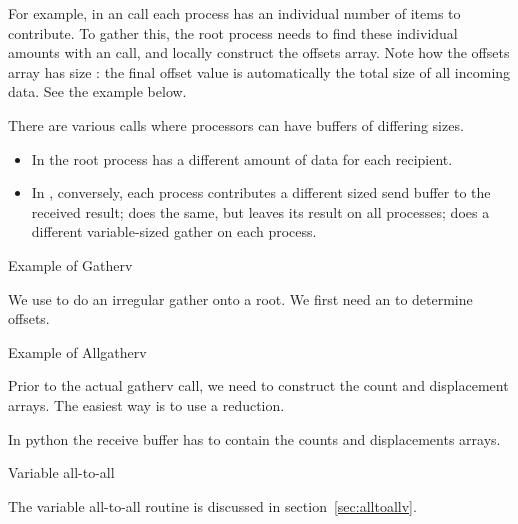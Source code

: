 For example, in an  call each process has an individual
number of items to contribute. To gather this, the root process needs
to find these individual amounts with an  call, and
locally construct the offsets array. Note how the offsets array has
size : the final offset value is automatically the total
size of all incoming data. See the example below.

There are various calls where processors can have
buffers of differing sizes.
\begin{itemize}
\item In  the root process has a different
  amount of data for each recipient.
\item In , conversely, each process
  contributes a different sized send buffer to the received result;
   does the same, but leaves its result
  on all processes;  does a different
  variable-sized gather on each process.
\end{itemize}

 {Example of Gatherv}

We use  to do an irregular gather onto a root. We first need an
 to determine offsets.
%
%


 {Example of Allgatherv}

Prior to the actual gatherv call, we need to construct the count and
displacement arrays. The easiest way is to use a reduction.


In python the receive buffer has to contain the counts and
displacements arrays.



 {Variable all-to-all}

The variable all-to-all routine 
is discussed in section~\ref{sec:alltoallv}.


